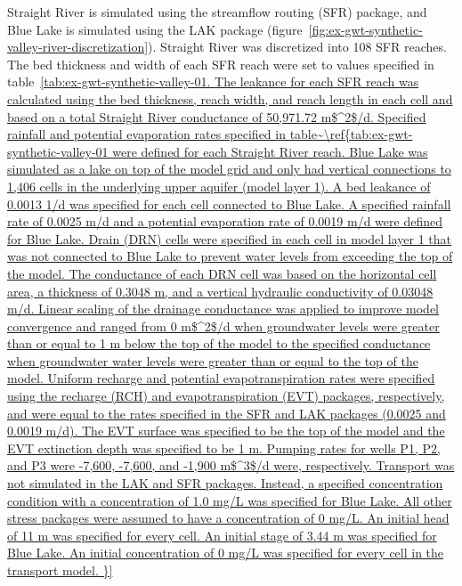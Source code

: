 Straight River is simulated using the streamflow routing (SFR) package, and Blue Lake is simulated using the LAK package (figure~\ref{fig:ex-gwt-synthetic-valley-river-discretization}). Straight River was discretized into 108 SFR reaches. The bed thickness and width of each SFR reach were set to values specified in table~\ref{tab:ex-gwt-synthetic-valley-01. The leakance for each SFR reach was calculated using the bed thickness, reach width, and reach length in each cell and based on a total Straight River conductance of 50,971.72 m$^2$/d. Specified rainfall and potential evaporation rates specified in table~\ref{tab:ex-gwt-synthetic-valley-01 were defined for each Straight River reach.

Blue Lake was simulated as a lake on top of the model grid and only had vertical connections to 1,406 cells in the underlying upper aquifer (model layer 1). A bed leakance of 0.0013 1/d was specified for each cell connected to Blue Lake. A specified rainfall rate of 0.0025 m/d and a potential evaporation rate of 0.0019 m/d were defined for Blue Lake.

Drain (DRN) cells were specified in each cell in model layer 1 that was not connected to Blue Lake to prevent water levels from exceeding the top of the model. The conductance of each DRN cell was based on the horizontal cell area, a thickness of 0.3048 m, and a vertical hydraulic conductivity of 0.03048 m/d. Linear scaling of the drainage conductance was applied to improve model convergence and ranged from 0 m$^2$/d when groundwater levels were greater than or equal to 1 m below the top of the model to the specified conductance when groundwater water levels were greater than or equal to the top of the model.

Uniform recharge and potential evapotranspiration rates were specified using the recharge (RCH) and evapotranspiration (EVT) packages, respectively, and were equal to the rates specified in the SFR and LAK packages (0.0025 and 0.0019 m/d). The EVT surface was specified to be the top of the model and the EVT extinction depth was specified to be 1 m.

Pumping rates for wells P1, P2, and P3 were -7,600, -7,600, and -1,900 m$^3$/d were, respectively.

Transport was not simulated in the LAK and SFR packages. Instead, a specified concentration condition with a concentration of 1.0 mg/L was specified for Blue Lake. All other stress packages were assumed to have a concentration of 0 mg/L.

An initial head of 11 m was specified for every cell. An initial stage of 3.44 m was specified for Blue Lake. An initial concentration of 0 mg/L was specified for every cell in the transport model.


}}

